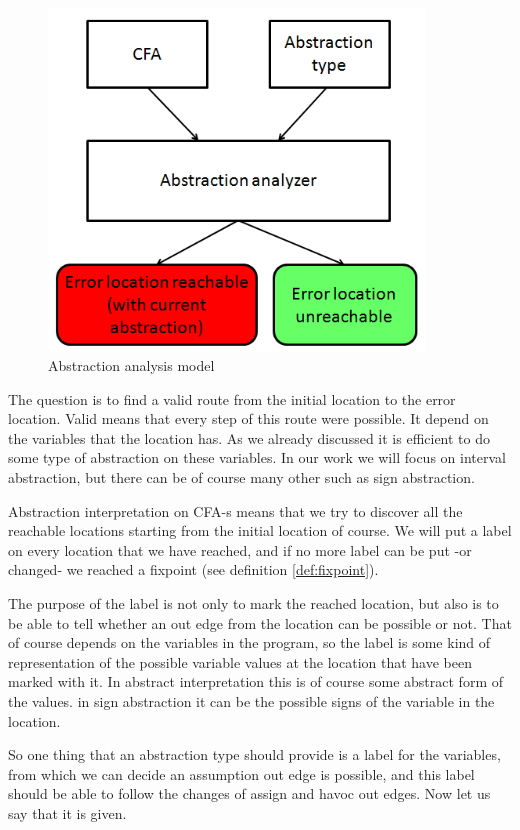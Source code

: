 \begin{figure} [!ht]
	\centering
	\includegraphics[width=100mm, keepaspectratio]{figures/abstractanalyzer.png}
	\caption{\label{fig:absanalyzer} Abstraction analysis model}
\end{figure}

The question is to find a valid route from the initial location to the error location. Valid means that every step of this route were possible. It depend on the variables that the location has. As we already discussed it is efficient to do some type of abstraction on these variables. In our work we will focus on interval abstraction, but there can be of course many other such as sign abstraction.

Abstraction interpretation on CFA-s means that we try to discover all the reachable locations starting from the initial location of course. We will put a label on every location that we have reached, and if no more label can be put -or changed- we reached a fixpoint (see definition \ref{def:fixpoint}).

The purpose of the label is not only to mark the reached location, but also is to be able to tell whether an out edge from the location can be possible or not. That of course depends on the variables in the program, so the label is some kind of representation of the possible variable values at the location that have been marked with it. In abstract interpretation this is of course some abstract form of the values. in sign abstraction it can be the possible signs of the variable in the location.

So one thing that an abstraction type should provide is a label for the variables, from which we can decide an assumption out edge is possible, and this label should be able to follow the changes of assign and havoc out edges. Now let us say that it is given.

